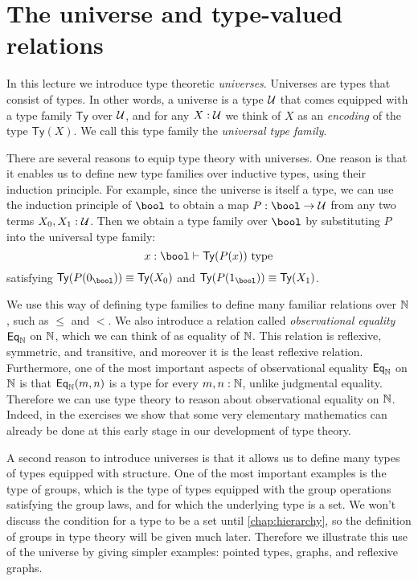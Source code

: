 \chapter{The universe and type-valued relations}

In this lecture we introduce type theoretic \emph{universes}. Universes are types that consist of types. In other words, a universe is a type $\mathcal{U}$ that comes equipped with a type family $\mathsf{Ty}$ over $\mathcal{U}$, and for any $X:\mathcal{U}$ we think of $X$ as an \emph{encoding} of the type $\mathsf{Ty}(X)$. We call this type family the \emph{universal type family}.

There are several reasons to equip type theory with universes. One reason is that it enables us to define new type families over inductive types, using their induction principle. For example, since the universe is itself a type, we can use the induction principle of $\bool$ to obtain a map $P:\bool\to\UU$ from any two terms $X_0,X_1:\mathcal{U}$. Then we obtain a type family over $\bool$ by substituting $P$ into the universal type family:
\begin{equation*}
  x:\bool\vdash \mathsf{Ty}(P(x))~\mathrm{type}
\end{equation*}
satisfying $\mathsf{Ty}(P(0_\bool))\jdeq \mathsf{Ty}(X_0)$ and $\mathsf{Ty}(P(1_\bool))\jdeq \mathsf{Ty}(X_1)$.

We use this way of defining type families to define many familiar relations over $\mathbb{N}$, such as $\leq$ and $<$. We also introduce a relation called \emph{observational equality} $\mathsf{Eq}_\mathbb{N}$ on $\mathbb{N}$, which we can think of as equality of $\mathbb{N}$. This relation is reflexive, symmetric, and transitive, and moreover it is the least reflexive relation. Furthermore, one of the most important aspects of observational equality $\mathsf{Eq}_\mathbb{N}$ on $\mathbb{N}$ is that $\mathsf{Eq}_\mathbb{N}(m,n)$ is a type for every $m,n:\mathbb{N}$, unlike judgmental equality. Therefore we can use type theory to reason about observational equality on $\mathbb{N}$. Indeed, in the exercises we show that some very elementary mathematics can already be done at this early stage in our development of type theory.

A second reason to introduce universes is that it allows us to define many types of types equipped with structure. One of the most important examples is the type of groups, which is the type of types equipped with the group operations satisfying the group laws, and for which the underlying type is a set. We won't discuss the condition for a type to be a set until \cref{chap:hierarchy}, so the definition of groups in type theory will be given much later. Therefore we illustrate this use of the universe by giving simpler examples: pointed types, graphs, and reflexive graphs.

